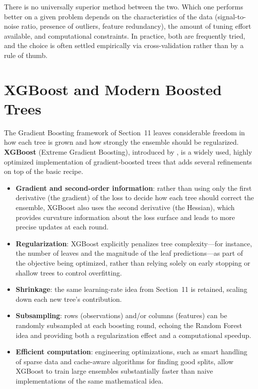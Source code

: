 \documentclass[12pt,a4paper]{article}
\begin{document}
There is no universally superior method between the two. Which one performs better on a given problem depends on the characteristics of the data (signal-to-noise ratio, presence of outliers, feature redundancy), the amount of tuning effort available, and computational constraints. In practice, both are frequently tried, and the choice is often settled empirically via cross-validation rather than by a rule of thumb.

\section{XGBoost and Modern Boosted Trees}
\label{sec:xgboost}

The Gradient Boosting framework of Section~11 leaves considerable freedom in how each tree is grown and how strongly the ensemble should be regularized. \textbf{XGBoost} (Extreme Gradient Boosting), introduced by \citet{chen2016xgboost}, is a widely used, highly optimized implementation of gradient-boosted trees that adds several refinements on top of the basic recipe.

\begin{itemize}[nosep]
    \item \textbf{Gradient and second-order information}: rather than using only the first derivative (the gradient) of the loss to decide how each tree should correct the ensemble, XGBoost also uses the second derivative (the Hessian), which provides curvature information about the loss surface and leads to more precise updates at each round.
    \item \textbf{Regularization}: XGBoost explicitly penalizes tree complexity---for instance, the number of leaves and the magnitude of the leaf predictions---as part of the objective being optimized, rather than relying solely on early stopping or shallow trees to control overfitting.
    \item \textbf{Shrinkage}: the same learning-rate idea from Section~11 is retained, scaling down each new tree's contribution.
    \item \textbf{Subsampling}: rows (observations) and/or columns (features) can be randomly subsampled at each boosting round, echoing the Random Forest idea and providing both a regularization effect and a computational speedup.
    \item \textbf{Efficient computation}: engineering optimizations, such as smart handling of sparse data and cache-aware algorithms for finding good splits, allow XGBoost to train large ensembles substantially faster than naive implementations of the same mathematical idea.
\end{itemize}
\end{document}
